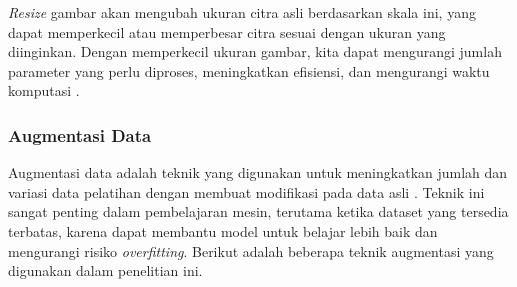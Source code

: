 \textit{Resize} gambar akan mengubah ukuran citra asli berdasarkan skala ini, yang dapat memperkecil atau memperbesar citra sesuai dengan ukuran yang diinginkan. Dengan memperkecil ukuran gambar, kita dapat mengurangi jumlah parameter yang perlu diproses, meningkatkan efisiensi, dan mengurangi waktu komputasi \cite{Xu2023ImageAugmentationSurvey}.







\subsubsection{Augmentasi Data} \label{II.teori11.3}
Augmentasi data adalah teknik yang digunakan untuk meningkatkan jumlah dan variasi data pelatihan dengan membuat modifikasi pada data asli \cite{shorten2019survey}. Teknik ini sangat penting dalam pembelajaran mesin, terutama ketika dataset yang tersedia terbatas, karena dapat membantu model untuk belajar lebih baik dan mengurangi risiko \textit{overfitting}. Berikut adalah beberapa teknik augmentasi yang digunakan dalam penelitian ini.

